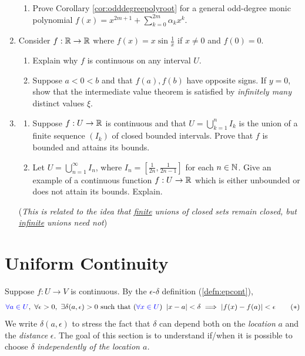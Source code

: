 \begin{exercisessec}{}{}
\begin{enumerate}
\begin{enumerate}
 	  \item Prove Corollary \ref{cor:odddegreepolyroot} for a general odd-degree monic polynomial $f(x)=x^{2m+1}+\sum\limits_{k=0}^{2m}\alpha_kx^k$. 
 	\end{enumerate}
 	

	
	\item Consider $f:\mathbb{R}\to\mathbb{R}$ where $f(x)=x\sin\frac 1x$ if $x\neq 0$ and $f(0)=0$.
	\begin{enumerate}
	  \item Explain why $f$ is continuous on any interval $U$.
	  \item Suppose $a<0<b$ and that $f(a),f(b)$ have opposite signs. If $y=0$, show that the intermediate value theorem is satisfied by \emph{infinitely many} distinct values $\xi$.
	\end{enumerate}
	
	
	\item\begin{enumerate}
	  \item Suppose $f:U\to\mathbb{R}$ is continuous and that $U=\bigcup\limits_{k=1}^nI_k$ is the union of a finite sequence $(I_k)$ of closed bounded intervals. Prove that $f$ is bounded and attains its bounds.
	  \item Let $U=\bigcup\limits_{n=1}^\infty I_n$, where $I_n=[\frac 1{2n},\frac 1{2n-1}]$ for each $n\in\mathbb{N}$. Give an example of a continuous function $f:U\to\mathbb{R}$ which is either unbounded or does not attain its bounds. Explain.
	\end{enumerate}
	(\emph{This is related to the idea that \underline{finite} unions of closed sets remain closed, but \underline{infinite} unions need not})
\end{enumerate}
\end{exercisessec}

\clearpage


\section{Uniform Continuity}\label{sec:uniformcont}

Suppose $f:U\to V$ is continuous. By the $\epsilon$-$\delta$ definition (\ref{defn:epcont}),
\[
	\textcolor{blue}{\forall a\in U},\ \forall \epsilon>0,\ \exists \delta(a,\epsilon)>0\text{ such that }(\textcolor{blue}{\forall x\in U})\ \nm{x-a}<\delta\implies\nm{f(x)-f(a)}<\epsilon\tag{$\ast$}
\]
We write $\delta(a,\epsilon)$ to stress the fact that $\delta$ can depend both on the \emph{location} $a$ and the \emph{distance} $\epsilon$. The goal of this section is to understand if/when it is possible to choose $\delta$ \emph{independently of the location $a$.}

